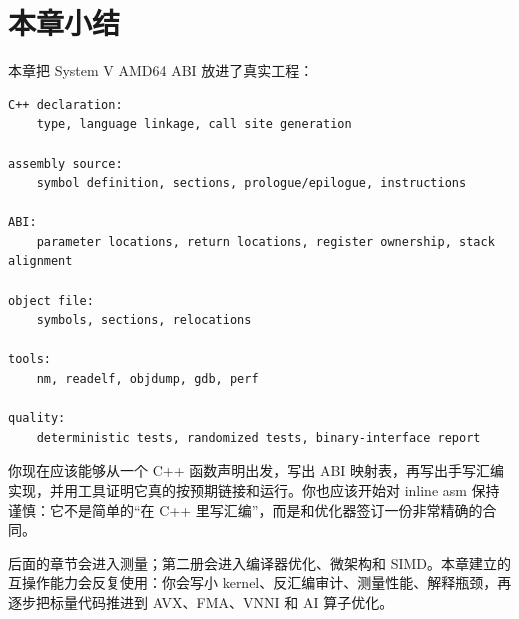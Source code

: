 \section{本章小结}

本章把 System V AMD64 ABI 放进了真实工程：

\begin{lstlisting}
C++ declaration:
    type, language linkage, call site generation

assembly source:
    symbol definition, sections, prologue/epilogue, instructions

ABI:
    parameter locations, return locations, register ownership, stack alignment

object file:
    symbols, sections, relocations

tools:
    nm, readelf, objdump, gdb, perf

quality:
    deterministic tests, randomized tests, binary-interface report
\end{lstlisting}

你现在应该能够从一个 C++ 函数声明出发，写出 ABI 映射表，再写出手写汇编实现，并用工具证明它真的按预期链接和运行。你也应该开始对 inline asm 保持谨慎：它不是简单的“在 C++ 里写汇编”，而是和优化器签订一份非常精确的合同。

后面的章节会进入测量；第二册会进入编译器优化、微架构和 SIMD。本章建立的互操作能力会反复使用：你会写小 kernel、反汇编审计、测量性能、解释瓶颈，再逐步把标量代码推进到 AVX、FMA、VNNI 和 AI 算子优化。
